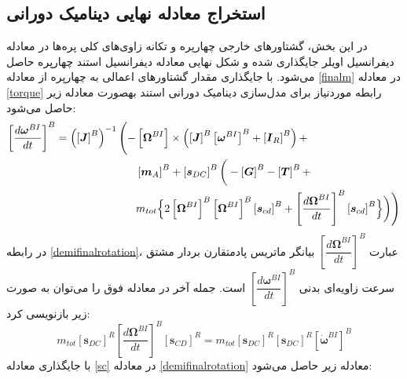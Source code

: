 \subsection{ استخراج معادله نهایی دينامیک دورانی}
در این بخش، گشتاورهای خارجی چهارپره و تكانه زاوی‌های کلی پره‌ها در معادله دیفرانسیل اویلر 
جایگذاری شده و شكل نهایی معادله دیفرانسیل استند چهارپره حاصل می‌شود. با جایگذاری مقدار 
گشتاورهای اعمالی به چهارپره از معادله
\ref{finalm}
در معادله 
\ref{torque}
رابطه موردنیاز برای مدل‌سازی
دینامیک دورانی استند بهصورت معادله زیر حاصل می‌شود:
\begin{equation}\label{demifinalrotation}
	\begin{split}
		\left[\dfrac{d\boldsymbol\omega^{BI}}{dt}\right]^B = 
		\left(\left[\boldsymbol J\right]^B\right)^{-1}\Bigg(
		-&\left[\boldsymbol\Omega^{BI}\right]\times\left(
		\left[\boldsymbol J\right]^B\left[\boldsymbol\omega^{BI}\right]^B
		+\left[\boldsymbol I_R\right]^B\right) + \\
		&\left[\boldsymbol m_A\right]^B+\left[\boldsymbol s_{DC}\right]^B
		\bigg(-\left[\boldsymbol G\right]^B
		-\left[\boldsymbol T\right]^B+ \\
		&m_{tot}\Bigl\{2
		\left[\boldsymbol \Omega^{BI}\right]^B
		\left[\boldsymbol \Omega^{BI}\right]^B
		\left[\boldsymbol s_{cd}\right]^B+
		\left[\dfrac{d\boldsymbol\Omega^{BI}}{dt}\right]^B
		\left[\boldsymbol s_{cd}\right]^B
		\Bigr\}\bigg)\Bigg)
	\end{split}
\end{equation}
در رابطه
\ref{demifinalrotation}،
عبارت
$\left[\dfrac{d\boldsymbol\Omega^{BI}}{dt}\right]^B$
بیانگر ماتریس پادمتقارن بردار مشتق سرعت‌ زاویه‌ای بدنی
$\left[\dfrac{d\boldsymbol\omega^{BI}}{dt}\right]^B$
است. جمله آخر در معادله فوق را می‌توان به صورت زیر بازنویسی کرد:
\begin{equation}\label{sc}
	m_{tot}\left[\boldsymbol s_{DC}\right]^R
	\left[\dfrac{d\boldsymbol\Omega^{BI}}{dt}\right]^B\left[\boldsymbol s_{CD}\right]^R = 
	m_{tot}\left[\boldsymbol s_{DC}\right]^R\left[\boldsymbol s_{DC}\right]^R
	\left[\dot{\boldsymbol\omega}^{BI}\right]^B
\end{equation}
با جایگذاری معادله
\ref{sc}
در معادله
\ref{demifinalrotation}
معادله زیر حاصل می‌شود:

